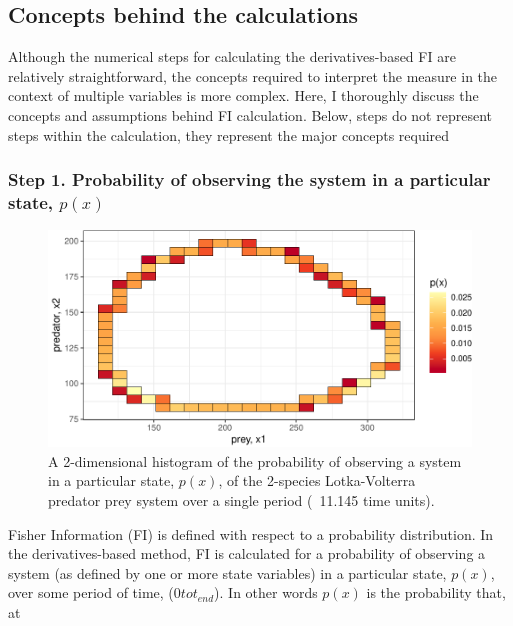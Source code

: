 \documentclass[12pt,twoside,openany]{reedthesis}
\begin{document}
\subsection{Concepts behind the
calculations}\label{concepts-behind-the-calculations}

Although the numerical steps for calculating the derivatives-based FI
are relatively straightforward, the concepts required to interpret the
measure in the context of multiple variables is more complex. Here, I
thoroughly discuss the concepts and assumptions behind FI calculation.
Below, steps do not represent steps within the calculation, they
represent the major concepts required

\subsubsection{\texorpdfstring{\textbf{Step 1. Probability of observing
the system in a particular state,
\(p(x)\)}}{Step 1. Probability of observing the system in a particular state, p(x)}}\label{step-1.-probability-of-observing-the-system-in-a-particular-state-px}
\begin{figure}

{\centering \includegraphics[width=0.85\linewidth]{_myDissertation_files/figure-latex/2D-hist-1} 

}

\caption{A 2-dimensional histogram of the probability of observing a system in a particular state, $p(x)$, of the 2-species Lotka-Volterra predator prey system over a single period (~11.145 time units).}\label{fig:2D-hist}
\end{figure}
Fisher Information (FI) is defined with respect to a probability
distribution. In the derivatives-based method, FI is calculated for a
probability of observing a system (as defined by one or more state
variables) in a particular state, \(p(x)\), over some period of time,
(\(0 to t_{end}\)). In other words \(p(x)\) is the probability that, at
\end{document}
